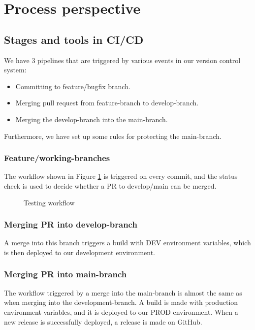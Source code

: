\section{Process perspective} \label{pp}

\subsection{Stages and tools in CI/CD} 
We have 3 pipelines that are triggered by various events in our  version control system:
\begin{itemize}
    \item Committing to feature/bugfix branch.
    \item Merging pull request from feature-branch to develop-branch.
    \item Merging the develop-branch into the main-branch.
\end{itemize}
Furthermore, we have set up some rules for protecting the main-branch.

\subsubsection*{Feature/working-branches}
The workflow shown in Figure \ref{fig:test-workflow} is triggered on every commit, and the status check is used to decide whether a PR to develop/main can be merged.
\begin{figure}[h!]
  \centering 
  
  \caption{Testing workflow}
  \label{fig:test-workflow}
\end{figure}

\subsubsection*{Merging PR into develop-branch}
A merge into this branch triggers a build with DEV environment variables, which is then deployed to our development environment.

\subsubsection*{Merging PR into main-branch}
The workflow triggered by a merge into the main-branch is almost the same as when merging into the development-branch. A build is made with production environment variables, and it is deployed to our PROD environment. When a new release is successfully deployed, a release is made on GitHub.

